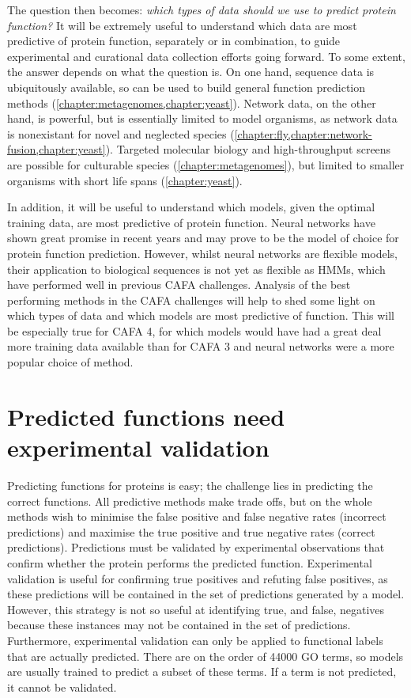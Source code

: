 The question then becomes: \emph{which types of data should we use to predict protein function?} It will be extremely useful to understand which data are most predictive of protein function, separately or in combination, to guide experimental and curational data collection efforts going forward. To some extent, the answer depends on what the question is. On one hand, sequence data is ubiquitously available, so can be used to build general function prediction methods (\ref{chapter:metagenomes,chapter:yeast}). Network data, on the other hand, is powerful, but is essentially limited to model organisms, as network data is nonexistant for novel and neglected species (\ref{chapter:fly,chapter:network-fusion,chapter:yeast}). Targeted molecular biology and high-throughput screens are possible for culturable species (\ref{chapter:metagenomes}), but limited to smaller organisms with short life spans (\ref{chapter:yeast}).

In addition, it will be useful to understand which models, given the optimal training data, are most predictive of protein function. Neural networks have shown great promise in recent years and may prove to be the model of choice for protein function prediction. However, whilst neural networks are flexible models, their application to biological sequences is not yet as flexible as HMMs, which have performed well in previous CAFA challenges. Analysis of the best performing methods in the CAFA challenges will help to shed some light on which types of data and which models are most predictive of function. This will be especially true for CAFA 4, for which models would have had a great deal more training data available than for CAFA 3 and neural networks were a more popular choice of method.

\section{Predicted functions need experimental validation}

Predicting functions for proteins is easy; the challenge lies in predicting the correct functions. All predictive methods make trade offs, but on the whole methods wish to minimise the false positive and false negative rates (incorrect predictions) and maximise the true positive and true negative rates (correct predictions). Predictions must be validated by experimental observations that confirm whether the protein performs the predicted function. Experimental validation is useful for confirming true positives and refuting false positives, as these predictions will be contained in the set of predictions generated by a model. However, this strategy is not so useful at identifying true, and false, negatives because these instances may not be contained in the set of predictions. Furthermore, experimental validation can only be applied to functional labels that are actually predicted. There are on the order of \num{44000} GO terms, so models are usually trained to predict a subset of these terms. If a term is not predicted, it cannot be validated.

